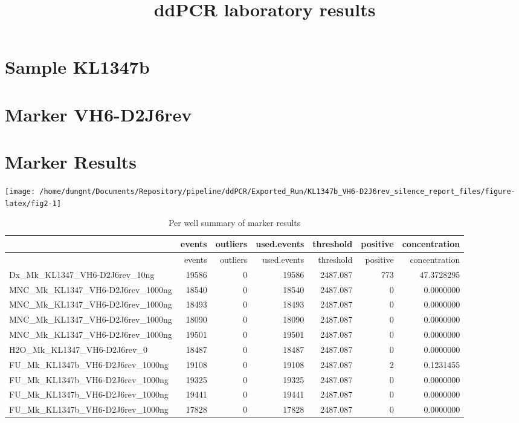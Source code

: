 \documentclass[
  10pt,
]{article}
\title{ddPCR laboratory results}
\author{}
\date{\vspace{-2.5em}}
\begin{document}
\maketitle


\pagestyle{plain}
\center

\hypertarget{sample-kl1347b}{%
\section{Sample KL1347b}\label{sample-kl1347b}}

\center

\hypertarget{marker-vh6-d2j6rev}{%
\section{Marker VH6-D2J6rev}\label{marker-vh6-d2j6rev}}

\hypertarget{marker-results}{%
\section{Marker Results}\label{marker-results}}

\begin{center}\texttt{[image: /home/dungnt/Documents/Repository/pipeline/ddPCR/Exported\_Run/KL1347b\_VH6-D2J6rev\_silence\_report\_files/figure-latex/fig2-1]} \end{center}

\begin{longtable}[]{@{}lrrrrrr@{}}
\caption{Per well summary of marker results}\tabularnewline
\toprule
& events & outliers & used.events & threshold & positive &
concentration\tabularnewline
\midrule
\endfirsthead
\toprule
& events & outliers & used.events & threshold & positive &
concentration\tabularnewline
\midrule
\endhead
Dx\_Mk\_KL1347\_VH6-D2J6rev\_10ng & 19586 & 0 & 19586 & 2487.087 & 773 &
47.3728295\tabularnewline
MNC\_Mk\_KL1347\_VH6-D2J6rev\_1000ng & 18540 & 0 & 18540 & 2487.087 & 0
& 0.0000000\tabularnewline
MNC\_Mk\_KL1347\_VH6-D2J6rev\_1000ng & 18493 & 0 & 18493 & 2487.087 & 0
& 0.0000000\tabularnewline
MNC\_Mk\_KL1347\_VH6-D2J6rev\_1000ng & 18090 & 0 & 18090 & 2487.087 & 0
& 0.0000000\tabularnewline
MNC\_Mk\_KL1347\_VH6-D2J6rev\_1000ng & 19501 & 0 & 19501 & 2487.087 & 0
& 0.0000000\tabularnewline
H2O\_Mk\_KL1347\_VH6-D2J6rev\_0 & 18487 & 0 & 18487 & 2487.087 & 0 &
0.0000000\tabularnewline
FU\_Mk\_KL1347b\_VH6-D2J6rev\_1000ng & 19108 & 0 & 19108 & 2487.087 & 2
& 0.1231455\tabularnewline
FU\_Mk\_KL1347b\_VH6-D2J6rev\_1000ng & 19325 & 0 & 19325 & 2487.087 & 0
& 0.0000000\tabularnewline
FU\_Mk\_KL1347b\_VH6-D2J6rev\_1000ng & 19441 & 0 & 19441 & 2487.087 & 0
& 0.0000000\tabularnewline
FU\_Mk\_KL1347b\_VH6-D2J6rev\_1000ng & 17828 & 0 & 17828 & 2487.087 & 0
& 0.0000000\tabularnewline
\bottomrule
\end{longtable}
\end{document}
